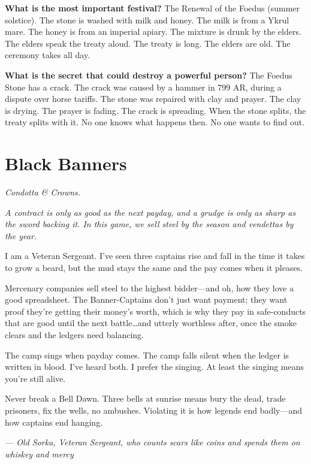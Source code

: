 \begin{almanac}
\textbf{What is the most important festival?} The Renewal of the Foedus (summer solstice). The stone is washed with milk and honey. The milk is from a Ykrul mare. The honey is from an imperial apiary. The mixture is drunk by the elders. The elders speak the treaty aloud. The treaty is long. The elders are old. The ceremony takes all day.

\textbf{What is the secret that could destroy a powerful person?} The Foedus Stone has a crack. The crack was caused by a hammer in 799 AR, during a dispute over horse tariffs. The stone was repaired with clay and prayer. The clay is drying. The prayer is fading. The crack is spreading. When the stone splits, the treaty splits with it. No one knows what happens then. No one wants to find out.
\end{almanac}

\newpage

\newpage

\chapter{Black Banners}
\emph{Condotta \& Crowns.}

\noindent
{\Large
\textit{A contract is only as good as the next payday, and a grudge is only as sharp as the sword backing it. In this game, we sell steel by the season and vendettas by the year.}

\vspace{0.5em}

I am a Veteran Sergeant. I've seen three captains rise and fall in the time it takes to grow a beard, but the mud stays the same and the pay comes when it pleases.

\vspace{0.5em}

Mercenary companies sell steel to the highest bidder---and oh, how they love a good spreadsheet. The Banner-Captains don't just want payment; they want proof they're getting their money's worth, which is why they pay in safe-conducts that are good until the next battle\dots and utterly worthless after, once the smoke clears and the ledgers need balancing.

\vspace{0.5em}

The camp sings when payday comes. The camp falls silent when the ledger is written in blood. I've heard both. I prefer the singing. At least the singing means you're still alive.

\vspace{0.5em}

Never break a Bell Dawn. Three bells at sunrise means bury the dead, trade prisoners, fix the wells, no ambushes. Violating it is how legends end badly---and how captains end hanging.

\vspace{1em}

\noindent\textit{--- Old Sorka, Veteran Sergeant, who counts scars like coins and spends them on whiskey and mercy}
}

